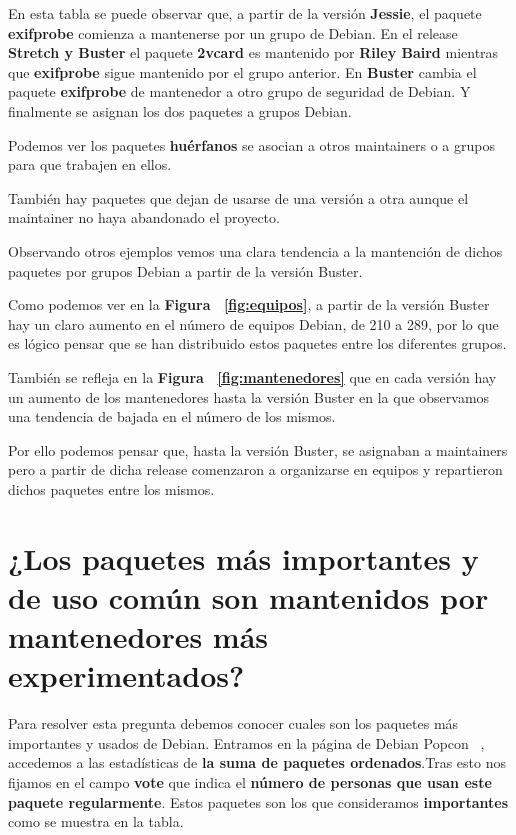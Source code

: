 \documentclass[a4paper, 12pt]{book}
\begin{document}
En esta tabla se puede observar que, a partir de la versión \textbf{Jessie}, el paquete \textbf{exifprobe} comienza a mantenerse por un grupo de Debian.
En el release \textbf{Stretch y Buster} el paquete \textbf{2vcard} es mantenido por \textbf{Riley Baird} mientras que \textbf{exifprobe} sigue mantenido por el grupo anterior.
En \textbf{Buster} cambia el paquete \textbf{exifprobe} de mantenedor a otro grupo de seguridad de Debian.
Y finalmente se asignan los dos paquetes a grupos Debian.

Podemos ver los paquetes \textbf{huérfanos} se asocian a otros maintainers o a grupos para que trabajen en ellos. 

También hay paquetes que dejan de usarse de una versión a otra aunque el maintainer no haya abandonado el proyecto.

Observando otros ejemplos vemos una clara tendencia a la mantención de dichos paquetes por grupos Debian a partir de la versión Buster.

Como podemos ver en la \textbf{Figura ~\ref{fig:equipos}}, a partir de la versión Buster hay un claro aumento en el número de equipos Debian, de 210 a 289, por lo que es lógico pensar que se han distribuido estos paquetes entre los diferentes grupos.

También se refleja en la \textbf{Figura ~\ref{fig:mantenedores}} que en cada versión hay un aumento de los mantenedores hasta la versión Buster en la que observamos una tendencia de bajada en el número de los mismos.

Por ello podemos pensar que, hasta la versión Buster, se asignaban a maintainers pero a partir de dicha release comenzaron a organizarse en equipos y repartieron dichos paquetes entre los mismos.


\section{¿Los paquetes más importantes y de uso común son mantenidos por mantenedores más experimentados?}
\label{sec:pregunta_6}

Para resolver esta pregunta debemos conocer cuales son los paquetes más importantes y usados de Debian. Entramos en la página de Debian Popcon ~\cite{debian:_popcon}, accedemos a las estadísticas de \textbf{la suma de paquetes ordenados}.Tras esto nos fijamos en el campo \textbf{vote} que indica el \textbf{número de personas que usan este paquete regularmente}. Estos paquetes son los que consideramos \textbf{importantes} como se muestra en la tabla.
\end{document}
